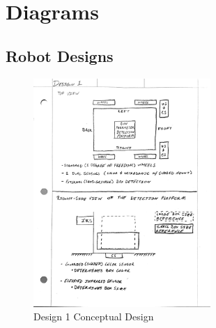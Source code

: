 \documentclass[12pt]{report}
\begin{document}
\chapter{Diagrams}\label{ap:diagrams}

\section{Robot Designs}
\label{sc:designs}

\begin{figure}[H]
    \centering
    \includegraphics[width=0.6\textwidth]{Images/Designs/Design1.pdf}
    \caption{Design 1 Conceptual Design}
    \label{fig:design1}
\end{figure}
\end{document}
